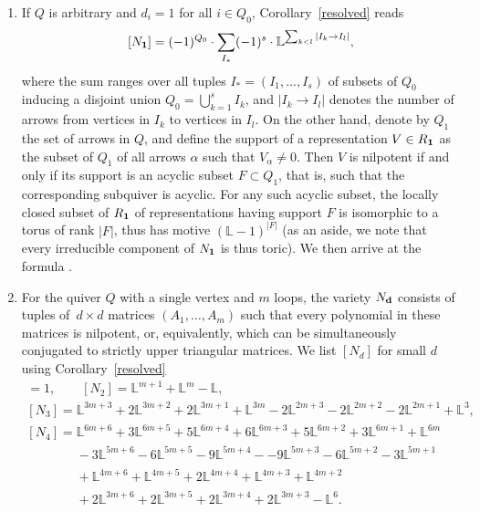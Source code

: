 \documentclass[10pt,a4paper]{amsart}
\numberwithin{equation}{section}
\theoremstyle{definition}
\begin{document}
\begin{enumerate}
\item[(3)] If $Q$ is arbitrary and $d_i=1$ for all $i\in Q_0$, Corollary~\ref{resolved} reads
\[[N_{\bf 1}]=(-1)^{Q_0}\cdot\sum_{I_*}(-1)^s\cdot\mathbb{L}^{\sum_{k<l}|I_k\rightarrow I_l|},\]
where the sum ranges over all tuples $I_*=(I_1,\dots,I_s)$ of subsets of $Q_0$ inducing a disjoint union $Q_0=\bigcup_{k=1}^sI_k$, and $|I_k\rightarrow I_l|$ denotes the number of arrows from vertices in $I_k$ to vertices in $I_l$. On the other hand, denote by $Q_1$ the set of arrows in $Q$, and define the support of a representation $V\in R_{\bf 1}$ as the subset of $Q_1$ of all arrows $\alpha$ such that $V_\alpha\not=0$. Then $V$ is nilpotent if and only if its support is an acyclic subset $F\subset Q_1$, that is, such that the corresponding subquiver is acyclic. For any such acyclic subset, the locally closed subset of $R_{\bf 1}$ of representations having support $F$ is isomorphic to a torus of rank $|F|$, thus has motive $(\mathbb{L}-1)^{|F|}$ (as an aside, we note that every irreducible component of $N_{\bf 1}$ is thus toric). We then arrive at the formula
.
\item[(4)] For the quiver $Q$ with a single vertex and $m$ loops, the variety $N_{\bf d}$ consists of tuples of~$d\times d$ matrices $(A_1,\dots,A_m)$ such that every polynomial in these matrices is nilpotent, or, equivalently, which can be simultaneously conjugated to strictly upper triangular matrices. We list $[N_d]$ for small $d$ using Corollary~\ref{resolved}
\begin{gather*}
[N_1]=1, \qquad [N_2]=\mathbb{L}^{m+1}+\mathbb{L}^m-\mathbb{L},\\
[N_3]=\mathbb{L}^{3m+3}+2\mathbb{L}^{3m+2}+2\mathbb{L}^{3m+1}+\mathbb{L}^{3m}
-2\mathbb{L}^{2m+3}-2\mathbb{L}^{2m+2}-2\mathbb{L}^{2m+1}+\mathbb{L}^3,\\
[N_4]=\mathbb{L}^{6m+6}+3\mathbb{L}^{6m+5}+5\mathbb{L}^{6m+4}+6\mathbb{L}^{6m+3}+5\mathbb{L}^{6m+2}+3\mathbb{L}^{6m+1}+\mathbb{L}^{6m}\\
\phantom{[N_4]=}{}-3\mathbb{L}^{5m+6}-6\mathbb{L}^{5m+5}-9\mathbb{L}^{5m+4}-
-9\mathbb{L}^{5m+3}-6\mathbb{L}^{5m+2}
-3\mathbb{L}^{5m+1}\\
\phantom{[N_4]=}{}+\mathbb{L}^{4m+6}+\mathbb{L}^{4m+5}+2\mathbb{L}^{4m+4}+\mathbb{L}^{4m+3}+\mathbb{L}^{4m+2}\\
\phantom{[N_4]=}{}+2\mathbb{L}^{3m+6}+2\mathbb{L}^{3m+5}+2\mathbb{L}^{3m+4}+2\mathbb{L}^{3m+3}-\mathbb{L}^6.
\end{gather*}

\end{enumerate}
\end{document}
